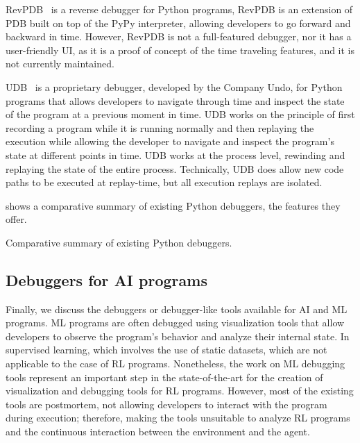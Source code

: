 \ac{RevPDB}~\cite{revdeb} is a reverse debugger for Python programs, RevPDB is an extension of 
\ac{PDB} built on top of the PyPy interpreter, allowing developers to go forward and backward in time. 
However, RevPDB is not a full-featured debugger, nor it has a user-friendly UI, as it is a proof of 
concept of the time traveling features, and it is not currently maintained.


\ac{UDB}~\cite{udb} is a proprietary debugger, developed by the Company Undo, for Python 
programs that allows developers to navigate through time and inspect the state of the program at a 
previous moment in time. \ac{UDB} works on the principle of first recording 
a program while it is running normally and then replaying the execution while allowing the 
developer to navigate and inspect the program's state at different points in time. \ac{UDB} works at 
the process level, rewinding and replaying the state of the entire process. Technically, 
\ac{UDB} does allow new code paths to be executed at replay-time, but all execution replays are 
isolated.

 shows a comparative summary of existing Python debuggers, the 
features they offer. 

\begin{table}[hptb]
  \centering
  \caption{Comparative summary of existing Python debuggers.}
  
  \label{tab:python-debuggers}
\end{table}


\subsection{Debuggers for \ac{AI} programs}
\label{sec:ai}

Finally, we discuss the debuggers or debugger-like tools available for \ac{AI} and \ac{ML} programs. 
\ac{ML} programs are often debugged using visualization tools that allow developers to observe the 
program's behavior and analyze their internal state. In supervised learning, which involves the use of  
static datasets, which are not applicable to the case of \ac{RL} programs. Nonetheless, the work on 
\ac{ML} debugging tools represent an important step in the state-of-the-art for the creation of 
visualization and debugging tools for \ac{RL} programs.
However, most of the existing tools are postmortem, not allowing developers to interact with the 
program during execution; therefore, making the tools unsuitable to analyze \ac{RL} programs and 
the continuous interaction between the environment and the agent.

